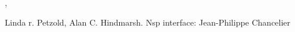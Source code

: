 \begin{manseealso}
  ,   
\end{manseealso}

\begin{authors}
 Linda r. Petzold, Alan C. Hindmarsh. Nsp interface: Jean-Philippe Chancelier
\end{authors}
